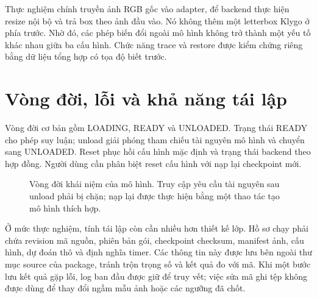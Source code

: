 Thực nghiệm chính truyền ảnh RGB gốc vào adapter, để backend thực hiện resize nội bộ và trả box theo ảnh đầu vào. Nó không thêm một letterbox Klygo ở phía trước. Nhờ đó, các phép biến đổi ngoài mô hình không trở thành một yếu tố khác nhau giữa ba cấu hình. Chức năng trace và restore được kiểm chứng riêng bằng dữ liệu tổng hợp có tọa độ biết trước.

\section{Vòng đời, lỗi và khả năng tái lập}
Vòng đời cơ bản gồm LOADING, READY và UNLOADED. Trạng thái READY cho phép suy luận; unload giải phóng tham chiếu tài nguyên mô hình và chuyển sang UNLOADED. Reset phục hồi cấu hình mặc định và trạng thái backend theo hợp đồng. Người dùng cần phân biệt reset cấu hình với nạp lại checkpoint mới.

\begin{figure}[H]\centering
{}
\caption{Vòng đời khái niệm của mô hình. Truy cập yêu cầu tài nguyên sau unload phải bị chặn; nạp lại được thực hiện bằng một thao tác tạo mô hình thích hợp.}
\end{figure}

Ở mức thực nghiệm, tính tái lập còn cần nhiều hơn thiết kế lớp. Hồ sơ chạy phải chứa revision mã nguồn, phiên bản gói, checkpoint checksum, manifest ảnh, cấu hình, dự đoán thô và định nghĩa timer. Các thông tin này được lưu bên ngoài thư mục source của package, tránh trộn trọng số và kết quả đo với mã. Khi một bước lưu kết quả gặp lỗi, log ban đầu được giữ để truy vết; việc sửa mã ghi tệp không được dùng để thay đổi ngầm mẫu ảnh hoặc các ngưỡng đã chốt.


